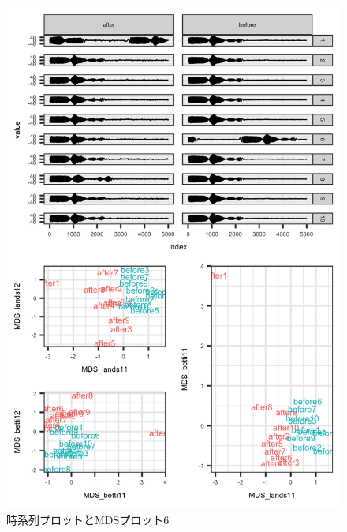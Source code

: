 \documentclass{jarticle}
\begin{document}
\begin{figure}[H]
	\begin{center}
		\includegraphics[width=15cm]{fig/MDS_plot6.png}
		\caption{時系列プロットとMDSプロット6}
		\label{fig:MDS_plot6}
	\end{center}
\end{figure}
\end{document}
